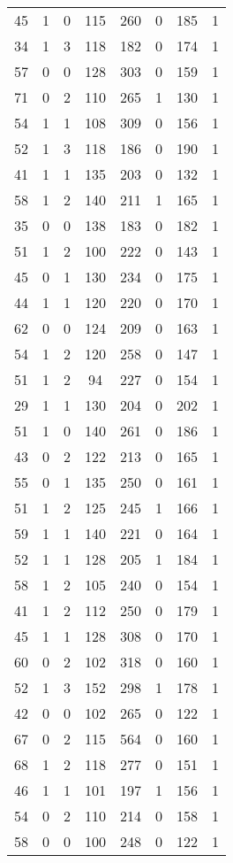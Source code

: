 \documentclass{article}
\begin{document}
\begin{longtable}{*{8}{c}}
45 & 1 & 0 & 115 & 260 & 0 & 185 & 1 \\
34 & 1 & 3 & 118 & 182 & 0 & 174 & 1 \\
57 & 0 & 0 & 128 & 303 & 0 & 159 & 1 \\
71 & 0 & 2 & 110 & 265 & 1 & 130 & 1 \\
54 & 1 & 1 & 108 & 309 & 0 & 156 & 1 \\
52 & 1 & 3 & 118 & 186 & 0 & 190 & 1 \\
41 & 1 & 1 & 135 & 203 & 0 & 132 & 1 \\
58 & 1 & 2 & 140 & 211 & 1 & 165 & 1 \\
35 & 0 & 0 & 138 & 183 & 0 & 182 & 1 \\
51 & 1 & 2 & 100 & 222 & 0 & 143 & 1 \\
45 & 0 & 1 & 130 & 234 & 0 & 175 & 1 \\
44 & 1 & 1 & 120 & 220 & 0 & 170 & 1 \\
62 & 0 & 0 & 124 & 209 & 0 & 163 & 1 \\
54 & 1 & 2 & 120 & 258 & 0 & 147 & 1 \\
51 & 1 & 2 & 94 & 227 & 0 & 154 & 1 \\
29 & 1 & 1 & 130 & 204 & 0 & 202 & 1 \\
51 & 1 & 0 & 140 & 261 & 0 & 186 & 1 \\
43 & 0 & 2 & 122 & 213 & 0 & 165 & 1 \\
55 & 0 & 1 & 135 & 250 & 0 & 161 & 1 \\
51 & 1 & 2 & 125 & 245 & 1 & 166 & 1 \\
59 & 1 & 1 & 140 & 221 & 0 & 164 & 1 \\
52 & 1 & 1 & 128 & 205 & 1 & 184 & 1 \\
58 & 1 & 2 & 105 & 240 & 0 & 154 & 1 \\
41 & 1 & 2 & 112 & 250 & 0 & 179 & 1 \\
45 & 1 & 1 & 128 & 308 & 0 & 170 & 1 \\
60 & 0 & 2 & 102 & 318 & 0 & 160 & 1 \\
52 & 1 & 3 & 152 & 298 & 1 & 178 & 1 \\
42 & 0 & 0 & 102 & 265 & 0 & 122 & 1 \\
67 & 0 & 2 & 115 & 564 & 0 & 160 & 1 \\
68 & 1 & 2 & 118 & 277 & 0 & 151 & 1 \\
46 & 1 & 1 & 101 & 197 & 1 & 156 & 1 \\
54 & 0 & 2 & 110 & 214 & 0 & 158 & 1 \\
58 & 0 & 0 & 100 & 248 & 0 & 122 & 1 \\

\end{longtable}
\end{document}
